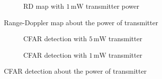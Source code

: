 \documentclass[12pt,DIV14,BCOR12mm,a4paper,footinclude=false,headinclude,parskip=half-,twoside,openright,cleardoublepage=empty,toc=index,bibliography=totoc,listof=totoc]{scrreprt}
\numberwithin{equation}{chapter}
\begin{document}
\begin{figure}[t]
\begin{subfigure}{0.45\textwidth}
        \caption{RD map with $1\,\mathrm{mW}$ transmitter power}
    \end{subfigure}
    \caption{Range-Doppler map about the power of transmitter}
    \label{range doppler map about the power of transmitter}
\end{figure}

\begin{figure}[t]
    \centering
    \begin{subfigure}{0.45\textwidth}
        \centering
        \caption{CFAR detection with $5\,\mathrm{mW}$ transmitter}
    \end{subfigure}\hspace{0.5cm}
    \begin{subfigure}{0.45\textwidth}
        \centering
        \caption{CFAR detection with $1\,\mathrm{mW}$ transmitter}
    \end{subfigure}
    \caption{CFAR detection about the power of transmitter}
    \label{cfar detection about the power of transmitter}
\end{figure}
\end{document}
